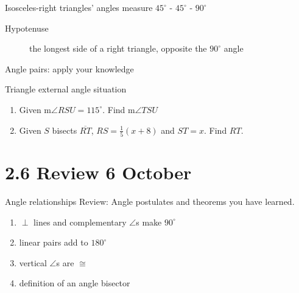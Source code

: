 \begin{frame}{Isosceles-right triangles' angles measure $45^\circ$ - $45^\circ$ - $90^\circ$}
   \vspace{1cm}
  \begin{description}
    \item[Hypotenuse] the longest side of a right triangle, opposite the $90^\circ$ angle 
  \end{description}
  \end{frame}


\begin{frame}{Angle pairs: apply your knowledge}
  \begin{block}{Triangle external angle situation}
    \begin{center}
    \end{center}
    \begin{enumerate}
      \item Given m$\angle RSU = 115^\circ$. Find m$\angle TSU$
      \item Given $S$ bisects $\overline{RT}$, $RS=\frac{1}{5} (x+8)$ and $ST = x$. Find $RT$.
  \end{enumerate}
  \end{block}
  \end{frame}
  
\section{2.6 Review \hfill 6 October}
\begin{frame}{Angle relationships}
  Review: Angle postulates and theorems you have learned. 
  \begin{enumerate}
    \item $\perp$ lines and complementary $\angle$s make $90^\circ$
    \item linear pairs add to $180^\circ$
    \item vertical $\angle$s are $\cong$
    \item definition of an angle bisector
  \end{enumerate}
\end{frame}

